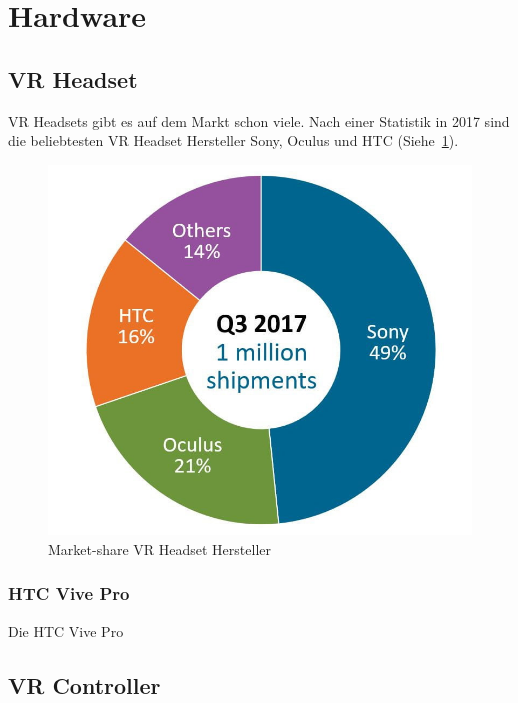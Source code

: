 \section{Hardware}

\subsection{VR Headset}\label{sec:vr-headset}

VR Headsets gibt es auf dem Markt schon viele.
Nach einer Statistik in 2017 sind die beliebtesten VR Headset Hersteller Sony, Oculus und HTC (Siehe~\ref{fig:vr_headset_manufacturer_marketshare}).

\begin{figure}
    \includegraphics[scale=0.5]{pics/vr_headset_manufacturer_marketshare}
    \caption{Market-share VR Headset Hersteller~\cite{MARTINDALE_2017}}
    \label{fig:vr_headset_manufacturer_marketshare}
\end{figure}

\subsubsection{HTC Vive Pro}

Die HTC Vive Pro

\subsection{VR Controller}\label{sec:vr-controller}


